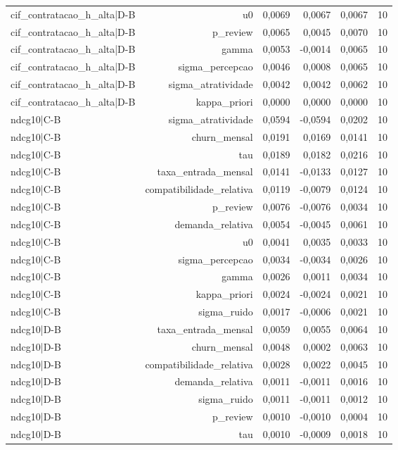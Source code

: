 \begin{table}[ht]
\begin{tabular}{lrrrrr}
cif\_contratacao\_h\_alta|D-B & u0 & 0,0069 & 0,0067 & 0,0067 & 10 \\
cif\_contratacao\_h\_alta|D-B & p\_review & 0,0065 & 0,0045 & 0,0070 & 10 \\
cif\_contratacao\_h\_alta|D-B & gamma & 0,0053 & -0,0014 & 0,0065 & 10 \\
cif\_contratacao\_h\_alta|D-B & sigma\_percepcao & 0,0046 & 0,0008 & 0,0065 & 10 \\
cif\_contratacao\_h\_alta|D-B & sigma\_atratividade & 0,0042 & 0,0042 & 0,0062 & 10 \\
cif\_contratacao\_h\_alta|D-B & kappa\_priori & 0,0000 & 0,0000 & 0,0000 & 10 \\
ndcg10|C-B & sigma\_atratividade & 0,0594 & -0,0594 & 0,0202 & 10 \\
ndcg10|C-B & churn\_mensal & 0,0191 & 0,0169 & 0,0141 & 10 \\
ndcg10|C-B & tau & 0,0189 & 0,0182 & 0,0216 & 10 \\
ndcg10|C-B & taxa\_entrada\_mensal & 0,0141 & -0,0133 & 0,0127 & 10 \\
ndcg10|C-B & compatibilidade\_relativa & 0,0119 & -0,0079 & 0,0124 & 10 \\
ndcg10|C-B & p\_review & 0,0076 & -0,0076 & 0,0034 & 10 \\
ndcg10|C-B & demanda\_relativa & 0,0054 & -0,0045 & 0,0061 & 10 \\
ndcg10|C-B & u0 & 0,0041 & 0,0035 & 0,0033 & 10 \\
ndcg10|C-B & sigma\_percepcao & 0,0034 & -0,0034 & 0,0026 & 10 \\
ndcg10|C-B & gamma & 0,0026 & 0,0011 & 0,0034 & 10 \\
ndcg10|C-B & kappa\_priori & 0,0024 & -0,0024 & 0,0021 & 10 \\
ndcg10|C-B & sigma\_ruido & 0,0017 & -0,0006 & 0,0021 & 10 \\
ndcg10|D-B & taxa\_entrada\_mensal & 0,0059 & 0,0055 & 0,0064 & 10 \\
ndcg10|D-B & churn\_mensal & 0,0048 & 0,0002 & 0,0063 & 10 \\
ndcg10|D-B & compatibilidade\_relativa & 0,0028 & 0,0022 & 0,0045 & 10 \\
ndcg10|D-B & demanda\_relativa & 0,0011 & -0,0011 & 0,0016 & 10 \\
ndcg10|D-B & sigma\_ruido & 0,0011 & -0,0011 & 0,0012 & 10 \\
ndcg10|D-B & p\_review & 0,0010 & -0,0010 & 0,0004 & 10 \\
ndcg10|D-B & tau & 0,0010 & -0,0009 & 0,0018 & 10 \\

\end{tabular}
\end{table}
